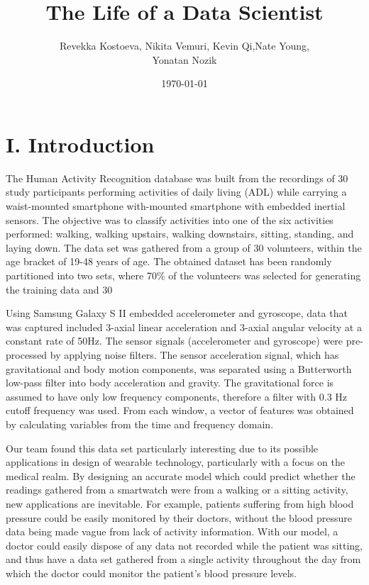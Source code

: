 \documentclass[12pt]{article}
\title{The Life of a Data Scientist}
\date{\today}
\author{Revekka Kostoeva, Nikita Vemuri, Kevin Qi,Nate Young, \\Yonatan Nozik}
\begin{document}
\maketitle

\section*{I. Introduction}
The Human Activity Recognition database was built from the recordings of 30 study participants performing activities of daily living (ADL) while carrying a waist-mounted smartphone with-mounted smartphone with embedded inertial sensors. The objective was to classify activities into one of the six activities performed: walking, walking upstairs, walking downstairs, sitting, standing, and laying down. The data set was gathered from a group of 30 volunteers, within the age bracket of 19-48 years of age. The obtained dataset has been randomly partitioned into two sets, where 70\% of the volunteers was selected for generating the training data and 30%

Using Samsung Galaxy S II embedded accelerometer and gyroscope, data that was captured included 3-axial linear acceleration and 3-axial angular velocity at a constant rate of 50Hz. The sensor signals (accelerometer and gyroscope) were pre-processed by applying noise filters. The sensor acceleration signal, which has gravitational and body motion components, was separated using a Butterworth low-pass filter into body acceleration and gravity. The gravitational force is assumed to have only low frequency components, therefore a filter with 0.3 Hz cutoff frequency was used. From each window, a vector of features was obtained by calculating variables from the time and frequency domain.

Our team found this data set particularly interesting due to its possible applications in design of wearable technology, particularly with a focus on the medical realm. By designing an accurate model which could predict whether the readings gathered from a smartwatch were from a walking or a sitting activity, new applications are inevitable. For example, patients suffering from high blood pressure could be easily monitored by their doctors, without the blood pressure data being made vague from lack of activity information. With our model, a doctor could easily dispose of any data not recorded while the patient was sitting, and thus have a data set gathered from a single activity throughout the day from which the doctor could monitor the patient's blood pressure levels.
\end{document}

